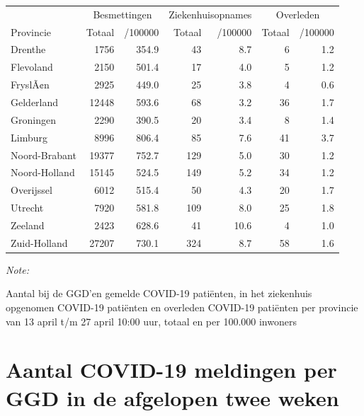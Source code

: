 \documentclass[
  english,
  man,floatsintext]{apa6}
\begin{document}
\begin{table}
\centering
\begin{threeparttable}
\begin{tabular}{lrrrrrr}
\toprule
\multicolumn{1}{c}{ } & \multicolumn{2}{c}{Besmettingen} & \multicolumn{2}{c}{Ziekenhuisopnames} & \multicolumn{2}{c}{Overleden} \\
\cmidrule(l{3pt}r{3pt}){2-3} \cmidrule(l{3pt}r{3pt}){4-5} \cmidrule(l{3pt}r{3pt}){6-7}
Provincie & Totaal & /100000 & Totaal & /100000 & Totaal & /100000\\
\midrule
Drenthe & 1756 & 354.9 & 43 & 8.7 & 6 & 1.2\\
Flevoland & 2150 & 501.4 & 17 & 4.0 & 5 & 1.2\\
FryslÃ¢n & 2925 & 449.0 & 25 & 3.8 & 4 & 0.6\\
Gelderland & 12448 & 593.6 & 68 & 3.2 & 36 & 1.7\\
Groningen & 2290 & 390.5 & 20 & 3.4 & 8 & 1.4\\
Limburg & 8996 & 806.4 & 85 & 7.6 & 41 & 3.7\\
Noord-Brabant & 19377 & 752.7 & 129 & 5.0 & 30 & 1.2\\
Noord-Holland & 15145 & 524.5 & 149 & 5.2 & 34 & 1.2\\
Overijssel & 6012 & 515.4 & 50 & 4.3 & 20 & 1.7\\
Utrecht & 7920 & 581.8 & 109 & 8.0 & 25 & 1.8\\
Zeeland & 2423 & 628.6 & 41 & 10.6 & 4 & 1.0\\
Zuid-Holland & 27207 & 730.1 & 324 & 8.7 & 58 & 1.6\\
\bottomrule
\end{tabular}
\begin{tablenotes}
\item \textit{Note: } 
\item Aantal bij de GGD’en gemelde COVID-19 patiënten, in het ziekenhuis opgenomen COVID-19 patiënten en overleden COVID-19 patiënten per provincie van 13 april t/m 27 april 10:00 uur, totaal en per 100.000 inwoners
\end{tablenotes}
\end{threeparttable}
\end{table}

\newpage

\hypertarget{aantal-covid-19-meldingen-per-ggd-in-de-afgelopen-twee-weken}{%
\section{Aantal COVID-19 meldingen per GGD in de afgelopen twee weken}\label{aantal-covid-19-meldingen-per-ggd-in-de-afgelopen-twee-weken}}
\end{document}
